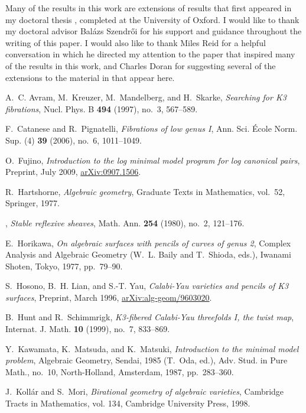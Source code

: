 \documentclass{amsart}
\begin{document}
\proof[Acknowledgements] Many of the results in this work are extensions of results that first appeared in my doctoral thesis \cite{mythesis}, completed at the University of Oxford. I would like to thank my doctoral advisor Bal\'{a}zs Szendr\H{o}i for his support and guidance throughout the writing of this paper. I would also like to thank Miles Reid for a helpful conversation in which he directed my attention to the paper \cite{flgi} that inspired many of the results in this work, and Charles Doran for suggesting several of the extensions to the material in \cite{mythesis} that appear here.

\begin{thebibliography}{10}
A.~C. Avram, M.~Kreuzer, M.~Mandelberg, and H.~Skarke, \emph{Searching for {K3}
  fibrations}, Nucl. Phys. B \textbf{494} (1997), no.~3, 567--589.

F.~Catanese and R.~Pignatelli, \emph{Fibrations of low genus {I}}, Ann. Sci.
  \'{E}cole Norm. Sup. (4) \textbf{39} (2006), no.~6, 1011--1049.

O.~Fujino, \emph{Introduction to the log minimal model program for log
  canonical pairs}, Preprint, July 2009, \url{arXiv:0907.1506}.

R.~Hartshorne, \emph{Algebraic geometry}, Graduate Texts in Mathematics,
  vol.~52, Springer, 1977.

\bysame, \emph{Stable reflexive sheaves}, Math. Ann. \textbf{254} (1980),
  no.~2, 121--176.

E.~Horikawa, \emph{On algebraic surfaces with pencils of curves of genus 2},
  Complex Analysis and Algebraic Geometry (W.~L. Baily and T.~Shioda, eds.),
  Iwanami Shoten, Tokyo, 1977, pp.~79--90.

S.~Hosono, B.~H. Lian, and S.-T. Yau, \emph{Calabi-Yau varieties and pencils of
  {K3} surfaces}, Preprint, March 1996, \url{arXiv:alg-geom/9603020}.

B.~Hunt and R.~Schimmrigk, \emph{{K}3-fibered {C}alabi-{Y}au threefolds {I},
  the twist map}, Internat. J. Math. \textbf{10} (1999), no.~7, 833--869.

Y.~Kawamata, K.~Matsuda, and K.~Matsuki, \emph{Introduction to the minimal
  model problem}, Algebraic Geometry, Sendai, 1985 (T.~Oda, ed.), Adv. Stud. in
  Pure Math., no.~10, North-Holland, Amsterdam, 1987, pp.~283--360.

J.~Koll{\'{a}}r and S.~Mori, \emph{Birational geometry of algebraic varieties},
  Cambridge Tracts in Mathematics, vol. 134, Cambridge University Press, 1998.


\end{thebibliography}
\end{document}
